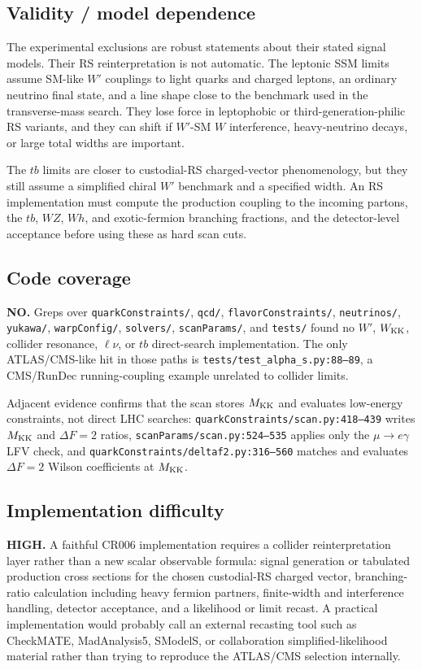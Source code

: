 \subsection*{Validity / model dependence}
The experimental exclusions are robust statements about their stated signal
models.  Their RS reinterpretation is not automatic.  The leptonic SSM limits
assume SM-like \(W'\) couplings to light quarks and charged leptons, an
ordinary neutrino final state, and a line shape close to the benchmark used in
the transverse-mass search.  They lose force in leptophobic or
third-generation-philic RS variants, and they can shift if \(W'\)-SM \(W\)
interference, heavy-neutrino decays, or large total widths are important.

The \(tb\) limits are closer to custodial-RS charged-vector phenomenology, but
they still assume a simplified chiral \(W'\) benchmark and a specified width.
An RS implementation must compute the production coupling to the incoming
partons, the \(tb\), \(WZ\), \(Wh\), and exotic-fermion branching fractions,
and the detector-level acceptance before using these as hard scan cuts.

\subsection*{Code coverage}
\textbf{NO.}  Greps over \texttt{quarkConstraints/}, \texttt{qcd/},
\texttt{flavorConstraints/}, \texttt{neutrinos/}, \texttt{yukawa/},
\texttt{warpConfig/}, \texttt{solvers/}, \texttt{scanParams/}, and
\texttt{tests/} found no \(W'\), \(W_{\rm KK}\), collider resonance,
\(\ell\nu\), or \(tb\) direct-search implementation.  The only ATLAS/CMS-like
hit in those paths is \texttt{tests/test\_alpha\_s.py:88--89}, a
CMS/RunDec running-coupling example unrelated to collider limits.

Adjacent evidence confirms that the scan stores \(M_{\rm KK}\) and evaluates
low-energy constraints, not direct LHC searches:
\texttt{quarkConstraints/scan.py:418--439} writes \(M_{\rm KK}\) and
\(\Delta F=2\) ratios, \texttt{scanParams/scan.py:524--535} applies only the
\(\mu\to e\gamma\) LFV check, and
\texttt{quarkConstraints/deltaf2.py:316--560} matches and evaluates
\(\Delta F=2\) Wilson coefficients at \(M_{\rm KK}\).

\subsection*{Implementation difficulty}
\textbf{HIGH.}  A faithful CR006 implementation requires a collider
reinterpretation layer rather than a new scalar observable formula: signal
generation or tabulated production cross sections for the chosen custodial-RS
charged vector, branching-ratio calculation including heavy fermion partners,
finite-width and interference handling, detector acceptance, and a likelihood
or limit recast.  A practical implementation would probably call an external
recasting tool such as CheckMATE, MadAnalysis5, SModelS, or collaboration
simplified-likelihood material rather than trying to reproduce the ATLAS/CMS
selection internally.

